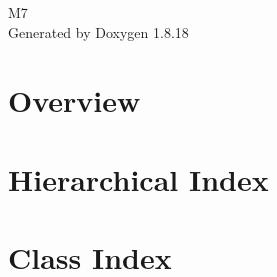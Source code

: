 \let\mypdfximage\pdfximage\def\pdfximage{\immediate\mypdfximage}\documentclass[twoside]{book}
\newcommand{\+}{\discretionary{\mbox{\scriptsize$\hookleftarrow$}}{}{}}
\newcommand{\clearemptydoublepage}{%
  \newpage{\pagestyle{empty}\cleardoublepage}%
}
\begin{document}
\hypersetup{pageanchor=false,
             bookmarksnumbered=true,
             pdfencoding=unicode
            }
\begin{titlepage}
\vspace*{7cm}
\begin{center}%
{\Large M7 }\\
\vspace*{1cm}
{\large Generated by Doxygen 1.8.18}\\
\end{center}
\end{titlepage}
\clearemptydoublepage
{}
\tableofcontents
\clearemptydoublepage
{}
\hypersetup{pageanchor=true}

\chapter{Overview}
\label{index}\hypertarget{index}{}
\chapter{Hierarchical Index}

\chapter{Class Index}

\end{document}
